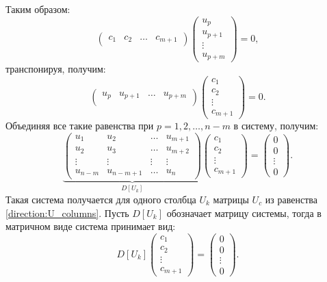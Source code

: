 Таким образом:
\[
    \begin{pmatrix}
        c_1 & c_2 & \dots & c_{m+1}
    \end{pmatrix}
    \begin{pmatrix}
        u_p     \\
        u_{p+1} \\
        \vdots  \\
        u_{p+m}
    \end{pmatrix}
    = 0 ,
\]
транспонируя, получим:
\[
    \begin{pmatrix}
        u_p & u_{p+1} & \dots & u_{p+m} \\
    \end{pmatrix}
    \begin{pmatrix}
        c_1    \\
        c_2    \\
        \vdots \\
        c_{m+1}
    \end{pmatrix}
    = 0 .
\]
Объединяя все такие равенства при $p=1, 2, \dots, n-m$ в систему, получим:
\[
    \underbrace{
        \begin{pmatrix}
            u_1     & u_2       & \dots  & u_{m+1} \\
            u_2     & u_3       & \dots  & u_{m+2} \\
            \vdots  & \vdots    & \vdots & \vdots  \\
            u_{n-m} & u_{n-m+1} & \dots  & u_n
        \end{pmatrix}
    }_{D[U_k]}
    \begin{pmatrix}
        c_1    \\
        c_2    \\
        \vdots \\
        c_{m+1}
    \end{pmatrix}
    = \begin{pmatrix}
        0      \\
        0      \\
        \vdots \\
        0
    \end{pmatrix} .
\]
Такая система получается для одного столбца $U_k$ матрицы $U_c$ из равенства \eqref{direction:U_columns}. Пусть $D[U_k]$ обозначает матрицу системы,
тогда в матричном виде система принимает вид:
\[
    D[U_k]
    \begin{pmatrix}
        c_1    \\
        c_2    \\
        \vdots \\
        c_{m+1}
    \end{pmatrix}
    =
    \begin{pmatrix}
        0      \\
        0      \\
        \vdots \\
        0
    \end{pmatrix} .
\]
